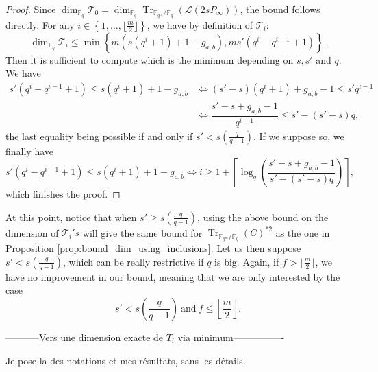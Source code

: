 \documentclass[a4paper]{article}
\theoremstyle{definition}
\theoremstyle{remark}
\newcommand{\calL}{\mathcal{L}}
\newcommand{\calT}{\mathcal{T}}
\newcommand{\fq}{\mathbb{F}_{q}}
\newcommand{\Tr}[1]{\operatorname{Tr}_{\mathbb{F}_{q^m}/\fq}\left(#1\right)}
\newcommand{\set}[1]{\left\{#1\right\}}
\begin{document}
\begin{proof}
   Since $\dim_{\fq} \calT_0 = \dim_{\fq} \Tr{\calL(2sP_\infty)}$, the bound follows directly. For any  $i \in \set{1,\dots,\lfloor \frac{m}{2} \rfloor}$, we have by definition of $\calT_i$:
   \[ \dim_{\fq} \calT_i \leq \min \left\{m(s(q^i+1)+1-g_{a,b}),ms'(q^i-q^{i-1}+1) \right\}.\]
   Then it is sufficient to compute which is the minimum depending on $s,s'$ and $q$. We have
   \begin{align*}
     s'(q^i-q^{i-1}+1) \leq s(q^i+1)+1-g_{a,b} & \iff (s'-s)(q^i+1)+g_{a,b}-1 \leq s'q^{i-1}  \\
     & \iff \dfrac{s'-s+g_{a,b}-1}{q^{i-1}} \leq s'-(s'-s)q   , 
   \end{align*}
   the last equality being possible if and only if $s'<s(\frac{q}{q-1})$. If we suppose so, we finally have
   $$ s'(q^i-q^{i-1}+1) \leq s(q^i+1)+1-g_{a,b} \iff i \geq  1 + \left\lceil \log_q \left( \dfrac{s'-s+g_{a,b}-1}{s'-(s'-s)q}\right)\right\rceil,$$
   which finishes the proof.
\end{proof}

At this point, notice that when $s' \geq s(\frac{q}{q-1})$, using the above bound on the dimension of $\calT_i's$ will give the same bound for $\Tr{C}^{*2}$ as the one in Proposition \ref{prop:bound_dim_using_inclusions}. Let us then suppose $s'<s(\frac{q}{q-1})$, which can be really restrictive if $q$ is big. Again, if $f > \lfloor \frac{m}{2} \rfloor$, we have no improvement in our bound, meaning that we are only interested by the case
$$ s'<s\left(\frac{q}{q-1}\right) \ \mathrm{and} \ f \leq \left\lfloor \frac{m}{2} \right\rfloor.$$

\begin{center}\color{red} -----------Vers une dimension exacte de $T_i$ via minimum----------------\color{black}\end{center}

\color{blue}Je pose la des notations et mes résultats, sans les détails.\color{black}
\end{document}

